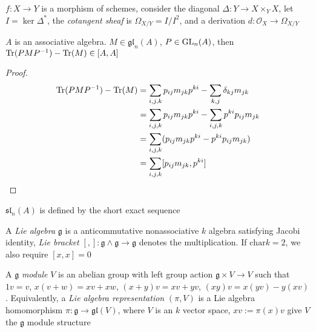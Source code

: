 \documentclass[main]{subfiles}
\begin{document}
\begin{definition}
$f:X\to Y$ is a morphism of schemes, consider the diagonal $\Delta:Y\to X\times_YX$, let $I=\ker\Delta^*$, the \textit{cotangent sheaf} is $\Omega_{X/Y}=I/I^2$, and a derivation $d:\mathcal O_X\to\Omega_{X/Y}$
\end{definition}

\begin{lemma}
$A$ is an associative algebra. $M\in\mathfrak{gl}_n(A)$, $P\in\operatorname{GL}_n(A)$, then $\operatorname{Tr}(PMP^{-1})-\operatorname{Tr}(M)\in[A,A]$
\end{lemma}

\begin{proof}
\begin{align*}
\operatorname{Tr}(PMP^{-1})-\operatorname{Tr}(M)&=\sum_{i,j,k}p_{ij}m_{jk}p^{ki}-\sum_{k,j}\delta_{kj}m_{jk} \\
&=\sum_{i,j,k}p_{ij}m_{jk}p^{ki}-\sum_{i,j,k}p^{ki}p_{ij}m_{jk} \\
&=\sum_{i,j,k}(p_{ij}m_{jk}p^{ki}-p^{ki}p_{ij}m_{jk}) \\
&=\sum_{i,j,k}[p_{ij}m_{jk},p^{ki}]
\end{align*}
\end{proof}

\begin{definition}
$\mathfrak{sl}_n(A)$ is defined by the short exact sequence
\begin{center}
\end{center}
\end{definition}

\begin{definition}
A \textit{Lie algebra} $\mathfrak{g}$ is a anticommutative nonassociative $k$ algebra satisfying Jacobi identity, \textit{Lie bracket} $[,]:\mathfrak{g}\wedge\mathfrak{g}\to\mathfrak{g}$ denotes the multiplication. If $\mathrm{char}k=2$, we also require $[x,x]=0$
\end{definition}

\begin{definition}
A $\mathfrak g$ \textit{module} $V$ is an abelian group with left group action $\mathfrak g\times V\to V$ such that $1v=v$, $x(v+w)=xv+xw$, $(x+y)v=xv+yv$, $(xy)v=x(yv)-y(xv)$. Equivalently, a \textit{Lie algebra representation} $(\pi,V)$ is a Lie algebra homomorphism $\pi:\mathfrak{g}\to \mathfrak{gl}(V)$, where $V$ is an $k$ vector space, $xv:=\pi(x)v$ give $V$ the $\mathfrak g$ module structure
\end{definition}
\end{document}
